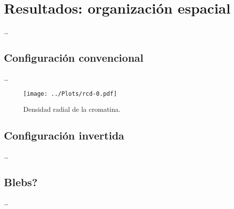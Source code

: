 \chapter{Resultados: organización espacial}
\label{cap:results}

\dots

\section{Configuración convencional}

\dots

\begin{figure}
  \centering
  \texttt{[image: ../Plots/rcd-0.pdf]}
  \caption{Densidad radial de la cromatina.}
  \label{fig:rcd-0}
\end{figure}

\section{Configuración invertida}

\dots

\section{Blebs?}

\dots
